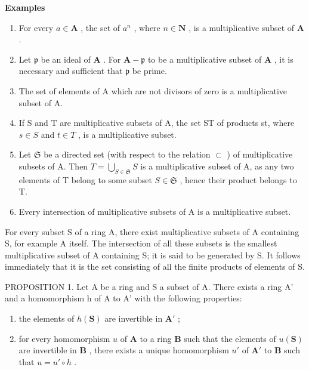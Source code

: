 \textbf{Examples}\par

\begin{enumerate}
\def\labelenumi{(\arabic{enumi})}
\item
  For every \(a \in \mathbf{A}\) , the set of \(a^n\) , where \(n \in \mathbf{N}\) , is a multiplicative subset of \(\mathbf{A}\) .
\item
  Let \(\mathfrak{p}\) be an ideal of \(\mathbf{A}\) . For \(\mathbf{A} - \mathfrak{p}\) to be a multiplicative subset of \(\mathbf{A}\) , it is necessary and sufficient that \(\mathfrak{p}\) be prime.
\item
  The set of elements of A which are not divisors of zero is a multiplicative subset of A.
\item
  If S and T are multiplicative subsets of A, the set ST of products st, where \(s \in S\) and \(t \in T\) , is a multiplicative subset.
\item
  Let \(\mathfrak{S}\) be a directed set (with respect to the relation \(\subset\) ) of multiplicative subsets of A. Then \(T = \bigcup_{S \in \mathfrak{S}} S\) is a multiplicative subset of A, as any two elements of T belong to some subset \(S \in \mathfrak{S}\) , hence their product belongs to T.
\item
  Every intersection of multiplicative subsets of A is a multiplicative subset.
\end{enumerate}

For every subset S of a ring A, there exist multiplicative subsets of A containing S, for example A itself. The intersection of all these subsets is the smallest multiplicative subset of A containing S; it is said to be generated by S. It follows immediately that it is the set consisting of all the finite products of elements of S.

PROPOSITION 1. Let A be a ring and S a subset of A. There exists a ring A' and a homomorphism h of A to A' with the following properties:

\begin{enumerate}
\def\labelenumi{(\arabic{enumi})}
\item
  the elements of \(h(\mathbf{S})\) are invertible in \(\mathbf{A}'\) ;
\item
  for every homomorphism \(u\) of \(\mathbf{A}\) to a ring \(\mathbf{B}\) such that the elements of \(u(\mathbf{S})\) are invertible in \(\mathbf{B}\) , there exists a unique homomorphism \(u'\) of \(\mathbf{A}'\) to \(\mathbf{B}\) such that \(u = u' \circ h\) .
\end{enumerate}

